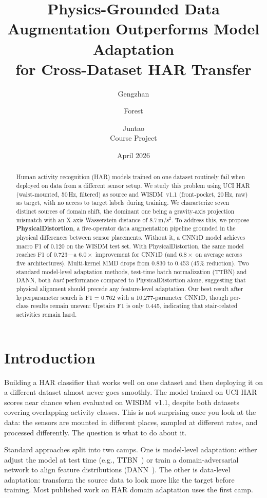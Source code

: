 \documentclass[12pt]{article}
\title{\textbf{Physics-Grounded Data Augmentation Outperforms Model Adaptation\\
for Cross-Dataset HAR Transfer}}
\author{Gengzhan \and Forest \and Juntao\\
\small Course Project}
\date{April 2026}
\begin{document}
\maketitle

\begin{abstract}
Human activity recognition (HAR) models trained on one dataset routinely fail when deployed on data from a different sensor setup. We study this problem using UCI HAR (waist-mounted, 50\,Hz, filtered) as source and WISDM~v1.1 (front-pocket, 20\,Hz, raw) as target, with no access to target labels during training. We characterize seven distinct sources of domain shift, the dominant one being a gravity-axis projection mismatch with an X-axis Wasserstein distance of 8.7\,m/s$^2$. To address this, we propose \textbf{PhysicalDistortion}, a five-operator data augmentation pipeline grounded in the physical differences between sensor placements. Without it, a CNN1D model achieves macro F1 of 0.120 on the WISDM test set. With PhysicalDistortion, the same model reaches F1 of 0.723—a $6.0\times$ improvement for CNN1D (and $6.8\times$ on average across five architectures). Multi-kernel MMD drops from 0.830 to 0.453 (45\% reduction). Two standard model-level adaptation methods, test-time batch normalization (TTBN) and DANN, both \emph{hurt} performance compared to PhysicalDistortion alone, suggesting that physical alignment should precede any feature-level adaptation. Our best result after hyperparameter search is F1 = 0.762 with a 10{,}277-parameter CNN1D, though per-class results remain uneven: Upstairs F1 is only 0.445, indicating that stair-related activities remain hard.
\end{abstract}

\section{Introduction}

Building a HAR classifier that works well on one dataset and then deploying it on a different dataset almost never goes smoothly. The model trained on UCI HAR scores near chance when evaluated on WISDM~v1.1, despite both datasets covering overlapping activity classes. This is not surprising once you look at the data: the sensors are mounted in different places, sampled at different rates, and processed differently. The question is what to do about it.

Standard approaches split into two camps. One is model-level adaptation: either adjust the model at test time (e.g., TTBN~\citep{schneider2020improving}) or train a domain-adversarial network to align feature distributions (DANN~\citep{ganin2016domain}). The other is data-level adaptation: transform the source data to look more like the target before training. Most published work on HAR domain adaptation uses the first camp.
\end{document}
